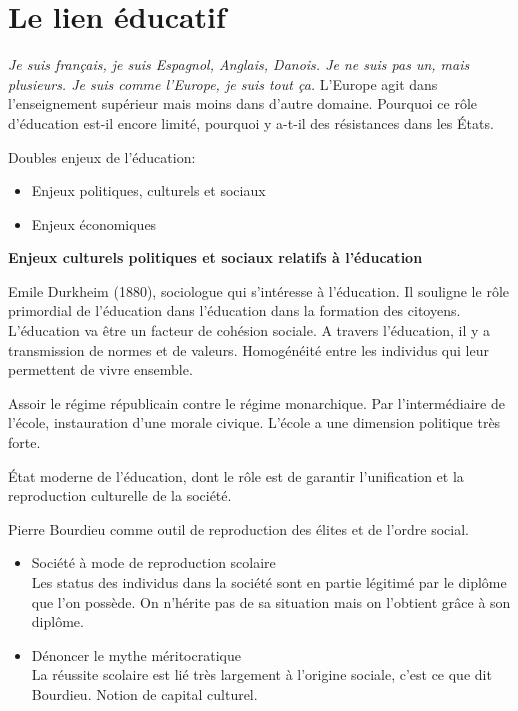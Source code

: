 \chapter{Le lien éducatif}

\emph{Je suis français, je suis Espagnol, Anglais, Danois. Je ne suis pas un, mais plusieurs. Je suis comme l'Europe, je suis tout ça.} L'Europe agit dans l'enseignement supérieur mais moins dans d'autre domaine. Pourquoi ce rôle d'éducation est-il encore limité, pourquoi y a-t-il des résistances dans les États.

Doubles enjeux de l'éducation: 
\begin{itemize}
\item Enjeux politiques, culturels et sociaux
\item Enjeux économiques
\end{itemize}

\textbf{Enjeux culturels politiques et sociaux relatifs à l'éducation}

Emile Durkheim (1880), sociologue qui s'intéresse à l'éducation. Il souligne le rôle primordial de l'éducation dans l'éducation dans la formation des citoyens. L'éducation va être un facteur de cohésion sociale. A travers l'éducation, il y a transmission de normes et de valeurs. Homogénéité entre les individus qui leur permettent de vivre ensemble.

Assoir le régime républicain contre le régime monarchique. Par l'intermédiaire de l'école, instauration d'une morale civique. L'école a une dimension politique très forte.

État moderne de l'éducation, dont le rôle est de garantir l'unification et la reproduction culturelle de la société.

Pierre Bourdieu comme outil de reproduction des élites et de l'ordre social.
\begin{itemize}
\item Société à mode de reproduction scolaire\\
Les status des individus dans la société sont en partie légitimé par le diplôme que l'on possède. On n’hérite pas de sa situation mais on l'obtient grâce à son diplôme.
\item Dénoncer le mythe méritocratique\\
La réussite scolaire est lié très largement à l'origine sociale, c'est ce que dit Bourdieu. Notion de capital culturel.
\end{itemize}



